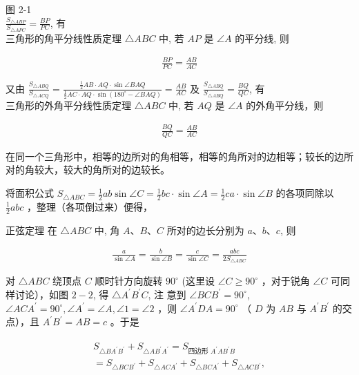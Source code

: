 \documentclass[10pt]{article}
\begin{document}
图 2-1\\
$\frac{S_{\triangle A B P}}{S_{\triangle A P C}}=\frac{B P}{P C}$, 有\\
三角形的角平分线性质定理 $\triangle A B C$ 中, 若 $A P$ 是 $\angle A$ 的平分线, 则

\begin{align*}
\frac{B P}{P C}=\frac{A B}{A C} \tag{2-4}
\end{align*}

又由 $\frac{S_{\triangle A B Q}}{S_{\triangle A C Q}}=\frac{\frac{1}{2} A B \cdot A Q \cdot \sin \angle B A Q}{\frac{1}{2} A C \cdot A Q \cdot \sin \left(180^{\circ}-\angle B A Q\right)}=\frac{A B}{A C}$ 及 $\frac{S_{\triangle A B Q}}{S_{\triangle A B Q}}=\frac{B Q}{Q C}$, 有\\
三角形的外角平分线性质定理 $\triangle A B C$ 中, 若 $A Q$ 是 $\angle A$ 的外角平分线，则

\begin{align*}
\frac{B Q}{Q C}=\frac{A B}{A C} \tag{2-5}
\end{align*}

在同一个三角形中，相等的边所对的角相等，相等的角所对的边相等；较长的边所对的角较大，较大的角所对的边较长。

将面积公式 $S_{\triangle A B C}=\frac{1}{2} a b \sin \angle C=\frac{1}{2} b c \cdot \sin \angle A=\frac{1}{2} c a \cdot \sin \angle B$ 的各项同除以 $\frac{1}{2} a b c$ ，整理（各项倒过来）便得，

正弦定理 在 $\triangle A B C$ 中, 角 $A 、 B 、 C$ 所对的边长分别为 $a 、 b 、 c$, 则

\begin{align*}
\frac{a}{\sin \angle A}=\frac{b}{\sin \angle B}=\frac{c}{\sin \angle C}=\frac{a b c}{2 S_{\triangle A B C}} \tag{2-6}
\end{align*}

对 $\triangle A B C$ 绕顶点 $C$ 顺时针方向旋转 $90^{\circ}$ (这里设 $\angle C \geqslant 90^{\circ}$ ，对于锐角 $\angle C$ 可同样讨论），如图 $2-2$, 得 $\triangle A^{\prime} B^{\prime} C$, 注 意到 $\angle B C B^{\prime}=90^{\circ}$, $\angle A C A^{\prime}=90^{\circ}, \angle A^{\prime}=\angle A, \angle 1=\angle 2$ ，则 $\angle A^{\prime} D A=90^{\circ}$ （ $D$ 为 $A B$ 与 $A^{\prime} B^{\prime}$ 的交点），且 $A^{\prime} B^{\prime}=A B=c$ 。于是

\begin{align*}
\begin{gathered}
S_{\triangle B A^{\prime} B^{\prime}}+S_{\triangle A B^{\prime} A^{\prime}}=S_{\text {四边形 } A^{\prime} A B^{\prime} B} \\
=S_{\triangle B C B^{\prime}}+S_{\triangle A C A^{\prime}}+S_{\triangle B C A^{\prime}}+S_{\triangle A C B^{\prime}},
\end{gathered}
\end{align*}
\end{document}
